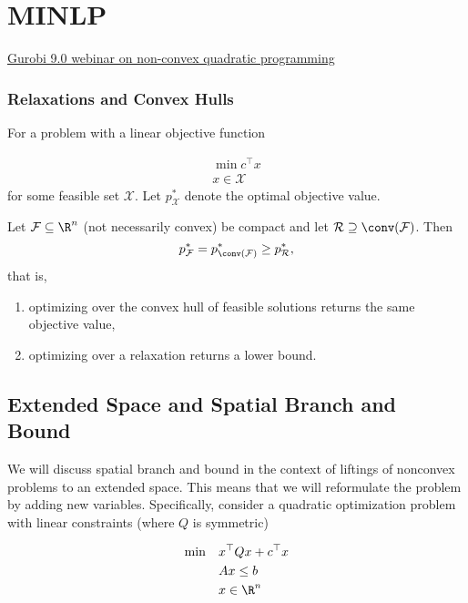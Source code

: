 
\chapter{MINLP}
\newcommand{\lift}{\mathrm{lift}}
\newcommand{\ub}{\mathrm{ubbest}}
\newcommand{\F}{{\mathcal F}}

\href{https://youtu.be/0g5cMvOV7KY}{Gurobi 9.0 webinar on non-convex quadratic programming}

\subsection{Relaxations and Convex Hulls}

For a problem with a linear objective function

\begin{align}
\min c^\top x\\
 x\in \mathcal X
\end{align}
for some feasible set $\mathcal X$.  Let $p^*_{\mathcal X}$ denote the optimal objective value.
\begin{theorem}
Let $\mathcal F \subseteq \R^n$ (not necessarily convex) be compact and let $\mathcal R \supseteq \conv(\mathcal F)$.  Then 
$$
p^*_\mathcal F = p^*_{\conv(\mathcal{F})} \geq p^*_{\mathcal R},
$$
that is, 
\begin{enumerate}
\item optimizing over the convex hull of feasible solutions returns the same objective value,
\item optimizing over a relaxation returns a lower bound.
\end{enumerate}
\end{theorem}

\section{Extended Space and Spatial Branch and Bound}
We will discuss spatial branch and bound in the context of liftings of nonconvex problems to an extended space.  This means that we will reformulate the problem by adding new variables.  Specifically,  consider a quadratic optimization problem with linear constraints (where $Q$ is symmetric)

\begin{align}
\min\quad  &x^\top Q x + c^\top x\\
&Ax \leq b\\
&x \in \R^n
\end{align}

